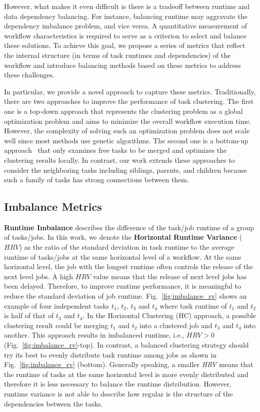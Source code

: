 However, what makes it even difficult is there is a tradeoff between runtime and data dependency balancing. For instance, balancing runtime may aggravate the dependency imbalance problem, and vice versa. A quantitative measurement of workflow characteristics is required to serve as a criterion to select and balance these solutions. To achieve this goal, we propose a series of metrics that reflect the internal structure (in terms of task runtimes and dependencies) of the workflow and introduce balancing methods based on these metrics to address these challenges. 

In particular, we provide a novel approach to capture these metrics. Traditionally, there are two approaches to improve the performance of task clustering. The first one is a top-down approach \cite{6217508} that represents the clustering problem as a global optimization problem and aims to minimize the overall workflow execution time. However, the complexity of solving such an optimization problem does not scale well since most methods use genetic algorithms. The second one is a bottom-up approach~\cite{Muthuvelu:2005:DJG:1082290.1082297,4958835} that only examines free tasks to be merged and optimizes the clustering results locally. In contrast, our work extends these approaches to consider the neighboring tasks including siblings, parents, and children because such a family of tasks has strong connections between them. 


\subsection{Imbalance Metrics}


\textbf{Runtime Imbalance} describes the difference of the task/job runtime of a group of tasks/jobs. In this work, we denote the \textbf{Horizontal Runtime Variance} ($HRV$) as the ratio of the standard deviation in task runtime to the average runtime of tasks/jobs at the same horizontal level of a workflow. At the same horizontal level, the job with the longest runtime often controls the release of the next level jobs. A high $HRV$ value means that the release of next level jobs has been delayed.
Therefore, to improve runtime performance, it is meaningful to reduce the standard deviation of job runtime. Fig.~\ref{fig:imbalance_rv} shows an example of four independent tasks $t_1$, $t_2$, $t_3$ and $t_4$ where task runtime of $t_1$ and $t_2$ is half of that of $t_3$ and $t_4$. In the Horizontal Clustering (HC) approach, a possible clustering result could be merging $t_1$ and $t_2$ into a clustered job and $t_3$ and $t_4$ into another. This approach results in imbalanced runtime, i.e., $HRV > 0$ (Fig.~\ref{fig:imbalance_rv}-top). In contrast, a balanced clustering strategy should try its best to evenly distribute task runtime among jobs as shown in Fig.~\ref{fig:imbalance_rv} (bottom). Generally speaking, a smaller \emph{HRV} means that the runtime of tasks at the same horizontal level is more evenly distributed and therefore it is less necessary to balance the runtime distribution. However, runtime variance is not able to describe how regular is the structure of the dependencies between the tasks.

